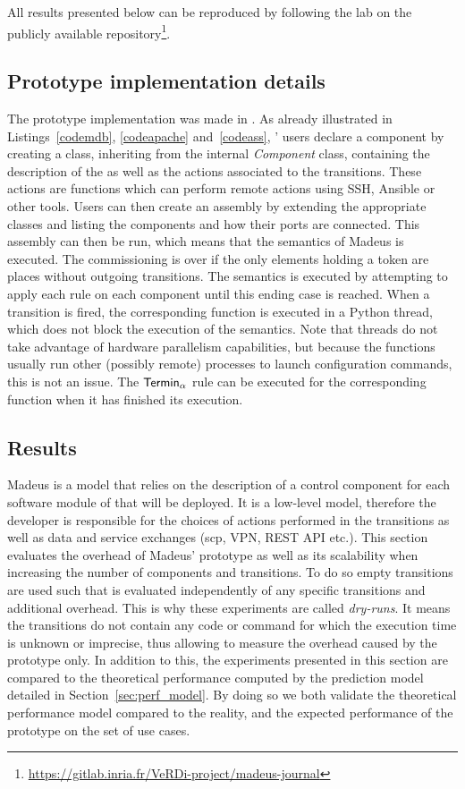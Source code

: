 All results presented below can be reproduced by following the lab on
the publicly available repository\footnote{\url{https://gitlab.inria.fr/VeRDi-project/madeus-journal}}.


\subsection{Prototype implementation details}
The prototype implementation was made in \python. As already illustrated in Listings~\ref{codemdb}, \ref{codeapache} and~\ref{codeass}, \mad' users declare a component by creating a class, inheriting from the internal \emph{Component} class, containing the description of the \net as well as the actions associated to the transitions. These actions are \python functions which can perform remote actions using SSH, Ansible or other tools. Users can then create an assembly by extending the appropriate classes and listing the components and how their ports are connected. This assembly can then be run, which means that the semantics of Madeus is executed. The commissioning is over if the only elements holding a token are places without outgoing transitions. The semantics is executed by attempting to apply each rule on each component until this ending case is reached. When a transition is fired, the corresponding \python function is executed in a Python thread, which does not block the execution of the semantics. Note that \python threads do not take advantage of hardware parallelism capabilities, but because the functions usually run other (possibly remote) processes to launch configuration commands, this is not an issue. The $\mathsf{Termin}_\alpha$ rule can be executed for the corresponding function when it has finished its execution.

\subsection{Results}

Madeus is a model that relies on the description of a control component for each software module of that will be deployed. It is a low-level model, therefore the developer is responsible for the choices of actions performed in the transitions as well as data and service exchanges (\eg scp, VPN, REST API etc.).  This section evaluates the overhead of Madeus' prototype as well as its scalability when increasing the number of components and transitions. To do so empty transitions are used such that \mad is evaluated independently of any specific transitions and additional overhead. This is why these experiments are called \emph{dry-runs}. It means the transitions do not contain any code or command for which the execution time is unknown or imprecise, thus allowing to measure the overhead caused by the prototype only. In addition to this, the experiments presented in this section are compared to the theoretical performance computed by the prediction model detailed in Section~\ref{sec:perf_model}. By doing so we both validate the theoretical performance model compared to the reality, and the expected performance of the prototype on the set of use cases.

